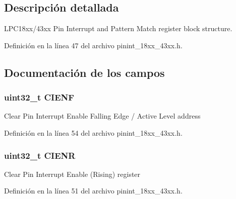 \subsection{Descripción detallada}
L\+P\+C18xx/43xx Pin Interrupt and Pattern Match register block structure. 

Definición en la línea 47 del archivo pinint\+\_\+18xx\+\_\+43xx.\+h.



\subsection{Documentación de los campos}
\subsubsection[{\texorpdfstring{C\+I\+E\+NF}{CIENF}}]{ uint32\+\_\+t C\+I\+E\+NF}\hypertarget{struct_l_p_c___p_i_n___i_n_t___t_a04ab7f0e571a2e496786159b8a983c38}{}\label{struct_l_p_c___p_i_n___i_n_t___t_a04ab7f0e571a2e496786159b8a983c38}
Clear Pin Interrupt Enable Falling Edge / Active Level address 

Definición en la línea 54 del archivo pinint\+\_\+18xx\+\_\+43xx.\+h.

\subsubsection[{\texorpdfstring{C\+I\+E\+NR}{CIENR}}]{ uint32\+\_\+t C\+I\+E\+NR}\hypertarget{struct_l_p_c___p_i_n___i_n_t___t_ae4c87e64e6141764f854f406162081dd}{}\label{struct_l_p_c___p_i_n___i_n_t___t_ae4c87e64e6141764f854f406162081dd}
Clear Pin Interrupt Enable (Rising) register 

Definición en la línea 51 del archivo pinint\+\_\+18xx\+\_\+43xx.\+h.

